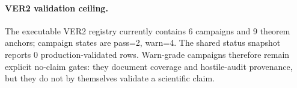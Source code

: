 \paragraph{VER2 validation ceiling.}
The executable VER2 registry currently contains 6 campaigns and
9 theorem anchors; campaign states are pass=2, warn=4. The shared
status snapshot reports 0 production-validated rows. Warn-grade
campaigns therefore remain explicit no-claim gates: they document coverage and
hostile-audit provenance, but they do not by themselves validate a scientific claim.
